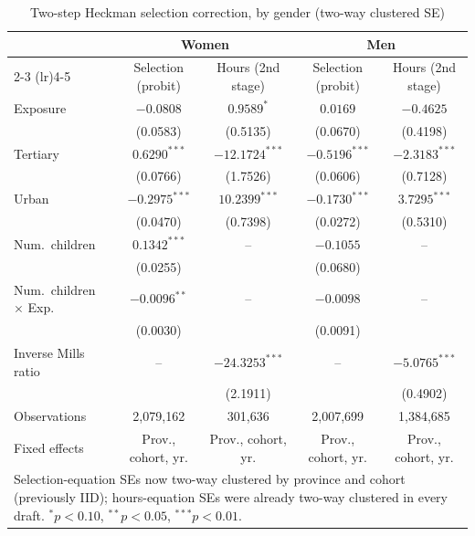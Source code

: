 \documentclass[11pt]{article}
\begin{document}
\begin{table}[htbp]
\centering
\caption{Two-step Heckman selection correction, by gender (two-way clustered SE)}
\label{tab:heckman}
\begin{tabular}{lcccc}
\toprule
 & \multicolumn{2}{c}{Women} & \multicolumn{2}{c}{Men} \\
 \cmidrule(lr){2-3} \cmidrule(lr){4-5}
 & Selection (probit) & Hours (2nd stage) & Selection (probit) & Hours (2nd stage) \\
\midrule
Exposure & $-0.0808$ & $0.9589^{*}$ & $0.0169$ & $-0.4625$ \\
 & (0.0583) & (0.5135) & (0.0670) & (0.4198) \\
Tertiary & $0.6290^{***}$ & $-12.1724^{***}$ & $-0.5196^{***}$ & $-2.3183^{***}$ \\
 & (0.0766) & (1.7526) & (0.0606) & (0.7128) \\
Urban & $-0.2975^{***}$ & $10.2399^{***}$ & $-0.1730^{***}$ & $3.7295^{***}$ \\
 & (0.0470) & (0.7398) & (0.0272) & (0.5310) \\
Num.\ children & $0.1342^{***}$ & -- & $-0.1055$ & -- \\
 & (0.0255) & & (0.0680) & \\
Num.\ children $\times$ Exp. & $-0.0096^{**}$ & -- & $-0.0098$ & -- \\
 & (0.0030) & & (0.0091) & \\
Inverse Mills ratio & -- & $-24.3253^{***}$ & -- & $-5.0765^{***}$ \\
 & & (2.1911) & & (0.4902) \\
\midrule
Observations & 2,079,162 & 301,636 & 2,007,699 & 1,384,685 \\
Fixed effects & Prov., cohort, yr. & Prov., cohort, yr. & Prov., cohort, yr. & Prov., cohort, yr. \\
\bottomrule
\multicolumn{5}{p{0.95\textwidth}}{\footnotesize Selection-equation SEs now two-way clustered by province and cohort (previously IID); hours-equation SEs were already two-way clustered in every draft. $^{*}p<0.10$, $^{**}p<0.05$, $^{***}p<0.01$.}
\end{tabular}
\end{table}
\end{document}
